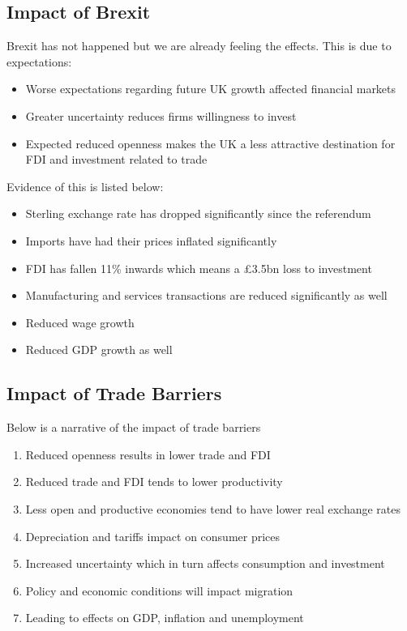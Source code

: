 \documentclass[12pt, letterpaper]{article}
\begin{document}
\subsection{Impact of Brexit}
Brexit has not happened but we are already feeling the effects. This is due to expectations:
\begin{itemize}
	\item Worse expectations regarding future UK growth affected financial markets
	\item Greater uncertainty reduces firms willingness to invest
	\item Expected reduced openness makes the UK a less attractive destination for FDI and investment related to trade
\end{itemize}
Evidence of this is listed below:
\begin{itemize}
	\item Sterling exchange rate has dropped significantly since the referendum
	\item Imports have had their prices inflated significantly
	\item FDI has fallen 11\% inwards which means a £3.5bn loss to investment
	\item Manufacturing and services transactions are reduced significantly as well
	\item Reduced wage growth
	\item Reduced GDP growth as well
\end{itemize}

\subsection{Impact of Trade Barriers}
Below is a narrative of the impact of trade barriers
\begin{enumerate}
	\item Reduced openness results in lower trade and FDI
	\item Reduced trade and FDI tends to lower productivity
	\item Less open and productive economies tend to have lower real exchange rates
	\item Depreciation and tariffs impact on consumer prices
	\item Increased uncertainty which in turn affects consumption and investment
	\item Policy and economic conditions will impact migration
	\item Leading to effects on GDP, inflation and unemployment
\end{enumerate}
\end{document}
